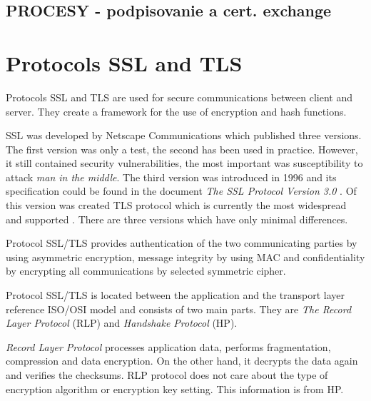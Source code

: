 \documentclass[
  digital, %
  notable,   %
  lof,     %
  lot,     %
]{fithesis3}
\begin{document}
\subsection{PROCESY - podpisovanie a cert. exchange}


\section{Protocols SSL and TLS}
Protocols SSL and TLS are used for secure communications between client and server. They 
create a framework for the use of encryption and hash functions.

SSL was developed by Netscape Communications which published three versions. The first version 
was only a test, the second has been used in practice. However, it still contained security 
vulnerabilities, the most important was susceptibility to attack \textit{man in the middle}. %
The third version was introduced in 1996 and its specification could be found in the document 
\textit{The SSL Protocol Version 3.0} \cite{freier2011secure}. Of this version was created TLS 
protocol which is currently the most widespread and supported \cite{oppliger2003security}. 
There are three versions which have only minimal differences.

Protocol SSL/TLS provides authentication of the two communicating parties by using asymmetric 
encryption, message integrity by using MAC and confidentiality by encrypting all 
communications by selected symmetric cipher.

Protocol SSL/TLS is located between the application and the transport layer reference ISO/OSI 
model and consists of two main parts. They are \textit{The Record Layer Protocol} (RLP) and 
\textit{Handshake Protocol} (HP). %

\textit{Record Layer Protocol} processes application data, performs fragmentation, compression 
and data encryption. On the other hand, it decrypts the data again and verifies the checksums. 
RLP protocol does not care about the type of encryption algorithm or encryption key setting. 
This information is from HP.
\end{document}
